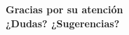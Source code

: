 \documentclass[14pt,aspectratio=169,usenames,dvipsnames]{beamer}
\begin{document}

    \begin{frame}{}
        \begin{center}
            \textbf{\huge Gracias por su atención\\\vspace{0.75em} {\Large¿Dudas? ¿Sugerencias?}}\\
        \end{center}
    \end{frame}

\end{document}
